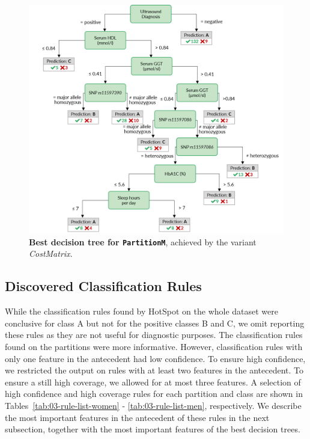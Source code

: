 \documentclass[
  oneside]{book}
\begin{document}
\begin{figure}[h]

{\centering \includegraphics[width=1\linewidth]{figures/03-tree-men} 

}

\caption{\textbf{Best decision tree for \texttt{PartitionM}}, achieved by the variant \emph{CostMatrix}.}\label{fig:03-tree-men}
\end{figure}

\hypertarget{imm-experiments-rules}{%
\subsection{Discovered Classification Rules}\label{imm-experiments-rules}}

While the classification rules found by HotSpot on the whole dataset were conclusive for class A but not for the positive classes B and C, we omit reporting these rules as they are not useful for diagnostic purposes.
The classification rules found on the partitions were more informative.
However, classification rules with only one feature in the antecedent had low confidence.
To ensure high confidence, we restricted the output on rules with at least two features in the antecedent.
To ensure a still high coverage, we allowed for at most three features.
A selection of high confidence and high coverage rules for each partition and class are shown in Tables~\ref{tab:03-rule-list-women} - \ref{tab:03-rule-list-men}, respectively.
We describe the most important features in the antecedent of these rules in the next subsection, together with the most important features of the best decision trees.
\end{document}
